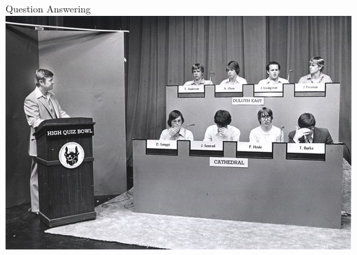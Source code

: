 \documentclass[compress]{beamer}
\begin{document}
{\begin{columns}
    \begin{block}{Question Answering}
      \centering
        \includegraphics[width=0.4\linewidth]{qb/quizbowl} \\
      \cite{boyd-graber-12,Boyd-Graber:Claudino:Socher:III-2014}
    \end{block}

\end{columns}

}
\end{document}
